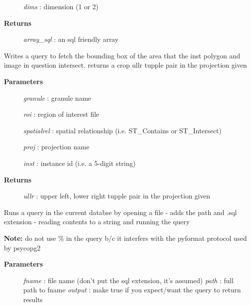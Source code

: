 \documentclass[letterpaper,10pt,english]{sphinxmanual}
\begin{document}
\begin{fulllineitems}
\begin{fulllineitems}
\begin{description}
\emph{dims}  :   dimension (1 or 2)

\item[{\textbf{Returns}}] \leavevmode
\emph{array\_sql} :   an sql friendly array

\end{description}

\end{fulllineitems}


\begin{fulllineitems}
\label{code:Database.Database.qryCropZone}
Writes a query to fetch the bounding box of the area that the inst polygon and
image in question intersect.
returns a crop ullr tupple pair in the projection given
\begin{description}
\item[{\textbf{Parameters}}] \leavevmode
\emph{granule} : granule name

\emph{roi}   :   region of interest file

\emph{spatialrel}    :   spatial relationship (i.e. ST\_Contains or ST\_Intersect)

\emph{proj}  :   projection name

\emph{inst}  :   instance id (i.e. a 5-digit string)

\item[{\textbf{Returns}}] \leavevmode
\emph{ullr}  :   upper left, lower right tupple pair in the projection given

\end{description}

\end{fulllineitems}


\begin{fulllineitems}
\label{code:Database.Database.qryFromFile}
Runs a query in the current databse by opening a file - adds the path and 
.sql extension - reading contents to a string and running the query

\textbf{Note:} do not use \% in the query b/c it interfers with the pyformat protocol
used by psycopg2
\begin{description}
\item[{\textbf{Parameters}}] \leavevmode
\emph{fname} :   file name (don't put the sql extension, it's assumed)
\emph{path}  :   full path to fname
\emph{output} : make true if you expect/want the query to return results


\end{description}
\end{fulllineitems}
\end{fulllineitems}
\end{document}
